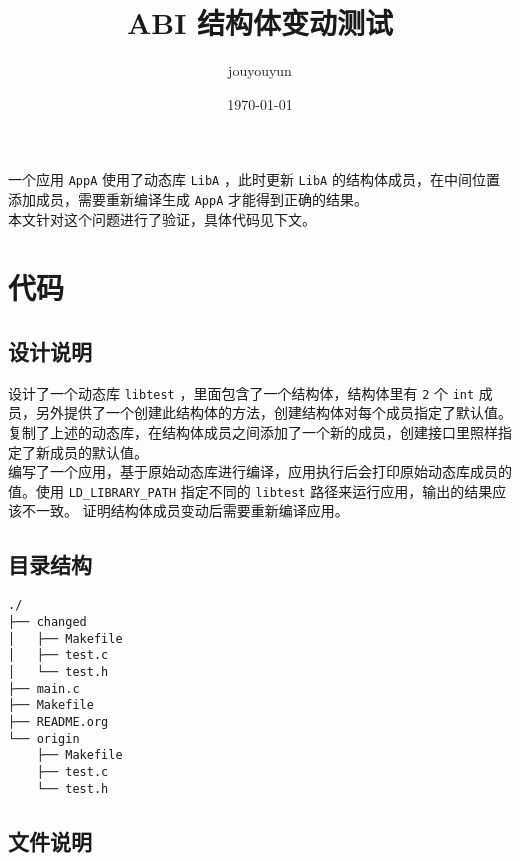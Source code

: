 \documentclass[a4paper,12pt]{article}
\author{jouyouyun}
\date{\today}
\title{ABI 结构体变动测试}
\begin{document}
\maketitle
\newpage

\tableofcontents
\newpage


一个应用 \texttt{AppA} 使用了动态库 \texttt{LibA} ，此时更新 \texttt{LibA} 的结构体成员，在中间位置添加成员，需要重新编译生成 \texttt{AppA} 才能得到正确的结果。\\

本文针对这个问题进行了验证，具体代码见下文。

\newpage

\section{代码}
\label{sec:orgdbc04b8}

\subsection{设计说明}
\label{sec:org6304594}

设计了一个动态库 \texttt{libtest} ，里面包含了一个结构体，结构体里有 \texttt{2} 个 \texttt{int} 成员，另外提供了一个创建此结构体的方法，创建结构体对每个成员指定了默认值。\\

复制了上述的动态库，在结构体成员之间添加了一个新的成员，创建接口里照样指定了新成员的默认值。\\

编写了一个应用，基于原始动态库进行编译，应用执行后会打印原始动态库成员的值。使用 \texttt{LD\_LIBRARY\_PATH} 指定不同的 \texttt{libtest} 路径来运行应用，输出的结果应该不一致。
证明结构体成员变动后需要重新编译应用。\\

\subsection{目录结构}
\label{sec:org8e5d34e}

\begin{verbatim}
./
├── changed
│   ├── Makefile
│   ├── test.c
│   └── test.h
├── main.c
├── Makefile
├── README.org
└── origin
    ├── Makefile
    ├── test.c
    └── test.h
\end{verbatim}

\subsection{文件说明}
\label{sec:orgabdba85}
\end{document}
